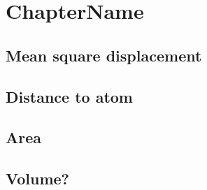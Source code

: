 \chapter{ChapterName}
    \section{Mean square displacement}
    \section{Distance to atom}
    \section{Area}
    \section{Volume?}
